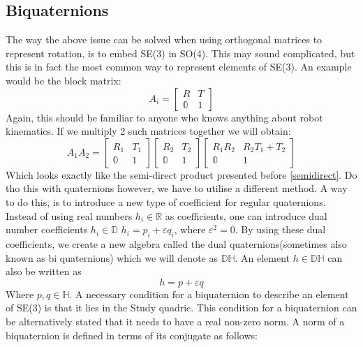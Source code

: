 \subsection{Biquaternions}
The way the above issue can be solved when using orthogonal matrices to represent rotation, is to embed SE(3) in SO(4). This may sound complicated, but this is in fact the most common way to represent elements of SE(3). An example would be the block matrix:
\begin{equation}
    A_i = \begin{bmatrix}
        R & T   \\
        \mathbb{0} & 1
    \end{bmatrix}
\end{equation}
Again, this should be familiar to anyone who knows anything about robot kinematics. If we multiply 2 such matrices together we will obtain:
\begin{equation}
    A_1A_2 =  \begin{bmatrix}
        R_1 & T_1   \\
        \mathbb{0} & 1
    \end{bmatrix} 
 \begin{bmatrix}
        R_2 & T_2   \\
        \mathbb{0} & 1
    \end{bmatrix} 
 \begin{bmatrix}
        R_1R_2 & R_2T_1 + T_2\\
        \mathbb{0} & 1
    \end{bmatrix}
\end{equation}
Which looks exactly like the semi-direct product presented before \ref{semidirect}. Do tho this with quaternions however, we have to utilise a different method. A way to do this, is to introduce a new type of coefficient for 
regular quaternions. Instead of using real numbers $h_i \in \mathbb{R}$ as coefficients, one can introduce dual number coefficients $h_i \in \mathbb{D}$ $h_i = p_i + \varepsilon q_i$, where  $\varepsilon^{2} = 0$. By using these dual coefficients, we create a new algebra called the dual quaternions(sometimes also known as bi quaternions) which we will denote as $\mathbb{DH}$. An element $h \in \mathbb{DH}$ can also be written as 
 \begin{equation}
    h = p + \varepsilon q
\end{equation}
Where $p,q \in \mathbb{H}$. 
A necessary condition for a biquaternion to describe an element of SE(3) is that it lies in the Study quadric\cite{Heged_s_2013}. This condition for a biquaternion can be alternatively stated that it needs to have a real non-zero norm. A norm of a biquaternion is defined in terms of its conjugate as follows:
